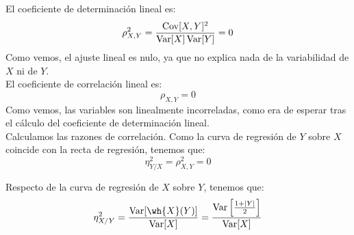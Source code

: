 \begin{ejercicio}
\begin{figure}[H]
    \end{figure}

    El coeficiente de determinación lineal es:
    \begin{equation*}
        \rho_{X,Y}^2 = \dfrac{\operatorname{Cov}[X,Y]^2}{\operatorname{Var}[X]\operatorname{Var}[Y]} = 0
    \end{equation*}
    Como vemos, el ajuste lineal es nulo, ya que no explica nada de la variabilidad de $X$ ni de $Y$.\\

    El coeficiente de correlación lineal es:
    \begin{equation*}
        \rho_{X,Y} = 0
    \end{equation*}
    Como vemos, las variables son linealmente incorreladas, como era de esperar tras el cálculo del coeficiente de determinación lineal.\\

    Calculamos las razones de correlación. Como la curva de regresión de $Y$ sobre $X$ coincide con la recta de regresión, tenemos que:
    \begin{equation*}
        \eta_{Y/X}^2 = \rho_{X,Y}^2 = 0
    \end{equation*}

    Respecto de la curva de regresión de $X$ sobre $Y$, tenemos que:
    \begin{equation*}
        \eta_{X/Y}^2 = \dfrac{\Var[\wh{X}(Y)]}{\Var[X]} = \dfrac{\Var\left[\frac{1+|Y|}{2}\right]}{\Var[X]}
    \end{equation*}


\end{ejercicio}
